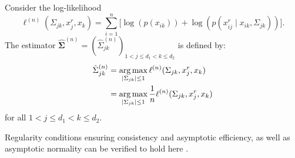 \begin{definition}\label{definition_case2}
    Consider the log-likelihood
    \begin{equation*}
        \ell^{(n)}(\Sigma_{jk}, x^r_j,x_k) = \sum_{i=1}^n \big[\log(p(x_{ik})) + \log(p(x^r_{ij} \mid x_{ik}, \Sigma_{jk}))\big].
    \end{equation*}
    The estimator $\hat{\mathbf{\Sigma}}^{(n)} = (\hat{\Sigma}_{jk}^{(n)})_{1 < j \leq d_1 < k \leq d_2}$ is defined by:
    \begin{equation}
        \begin{split}
            \hat{\Sigma}_{jk}^{(n)} &= \argmax_{\Abs{\Sigma_{jk}} \leq 1} \ell^{(n)}(\Sigma_{jk}, x^r_j,x_k) \\
            &= \argmax_{\Abs{\Sigma_{jk}} \leq 1} \frac{1}{n} \ell^{(n)}(\Sigma_{jk}, x^r_j,x_k)
        \end{split}
    \end{equation}
    for all $1 < j \leq d_1 < k \leq d_2$.
\end{definition}
\noindent Regularity conditions ensuring consistency and asymptotic efficiency, as well as asymptotic normality can be verified to hold here \citep{Cox74}.

